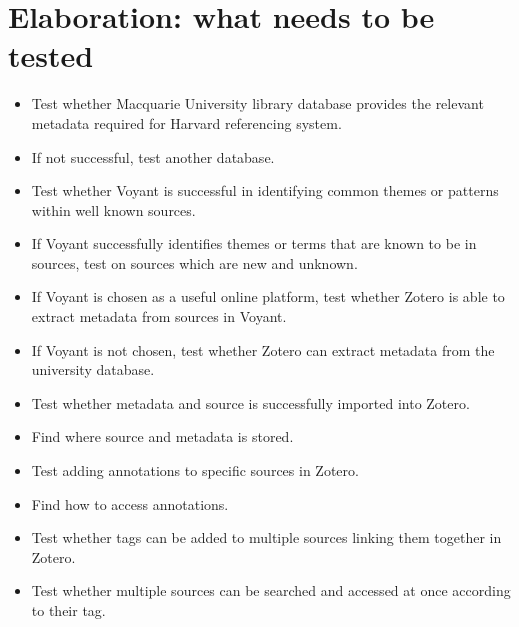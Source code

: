 \documentclass{article}
\begin{document}
\section{Elaboration: what needs to be tested }
\begin{itemize}
    \item Test whether Macquarie University library database provides the relevant metadata required for Harvard referencing system.
    \item If not successful, test another database. 
    \item Test whether Voyant is successful in identifying common themes or patterns within well known sources. 
    \item If Voyant successfully identifies themes or terms that are known to be in sources, test on sources which are new and unknown. \item If Voyant is chosen as a useful online platform, test whether Zotero is able to extract metadata from sources in Voyant.
    \item If Voyant is not chosen, test whether Zotero can extract metadata from the university database. 
    \item Test whether metadata and source is successfully imported into Zotero.
    \item Find where source and metadata is stored.
    \item Test adding annotations to specific sources in Zotero.
    \item Find how to access annotations.
    \item Test whether tags can be added to multiple sources linking them together in Zotero.
    \item Test whether multiple sources can be searched and accessed at once according to their tag. 
\end{itemize}
\end{document}
